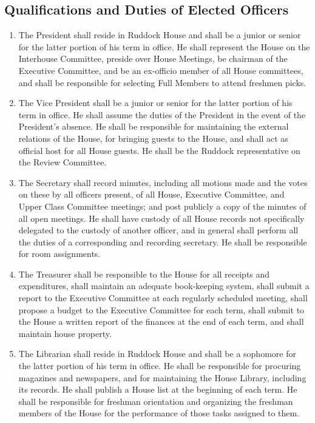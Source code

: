 \documentclass[10pt]{article} %
\begin{document}
\subsection{Qualifications and Duties of Elected Officers}
\begin{enumerate}
\item The President shall reside in Ruddock House and shall be a junior or senior for the latter portion of his term in office. He shall represent the House on the Interhouse Committee, preside over House Meetings, be chairman of the Executive Committee, and be an ex-officio member of all House committees, and shall be responsible for selecting Full Members to attend freshmen picks.
\item The Vice President shall be a junior or senior for the latter portion of his term in office. He shall assume the duties of the President in the event of the President’s absence. He shall be responsible for maintaining the external relations of the House, for bringing guests to the House, and shall act as official host for all House guests. He shall be the Ruddock representative on the Review Committee.
\item The Secretary shall record minutes, including all motions made and the votes on these by all officers present, of all House, Executive Committee, and Upper Class Committee meetings; and post publicly a copy of the minutes of all open meetings. He shall have custody of all House records not specifically delegated to the custody of another officer, and in general shall perform all the duties of a corresponding and recording secretary. He shall be responsible for room assignments.
\item The Treasurer shall be responsible to the House for all receipts and expenditures, shall maintain an adequate book-keeping system, shall submit a report to the Executive Committee at each regularly scheduled meeting, shall propose a budget to the Executive Committee for each term, shall submit to the House a written report of the finances at the end of each term, and shall maintain house property.
\item The Librarian shall reside in Ruddock House and shall be a sophomore for the latter portion of his term in office. He shall be responsible for procuring magazines and newspapers, and for maintaining the House Library, including its records. He shall publish a House list at the beginning of each term. He shall be responsible for freshman orientation and organizing the freshman members of the House for the performance of those tasks assigned to them.

\end{enumerate}
\end{document}
